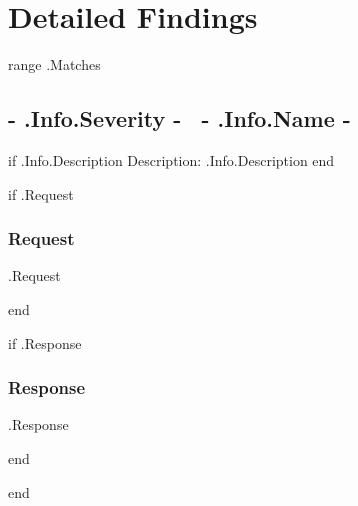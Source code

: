 \documentclass{article}
\begin{document}
\section{Detailed Findings}

\localtableofcontents

{{range .Matches}}

	\subsection{ \colorbox{ {{- .Info.Severity -}} }{ {{- .Info.Severity -}} }~{{- .Info.Name -}} }

	{{if .Info.Description}}
	Description: {{ .Info.Description }}
	{{end}}

	{{if .Request}}

	\subsubsection{Request}

    \begin{Highlighting}
{{.Request}} 
    \end{Highlighting}
	{{end}}

	{{if .Response}}
    \subsubsection{Response}
    \begin{Highlighting}
{{.Response}}
    \end{Highlighting}
	{{end}}
 
{{end}}

\end{document}
